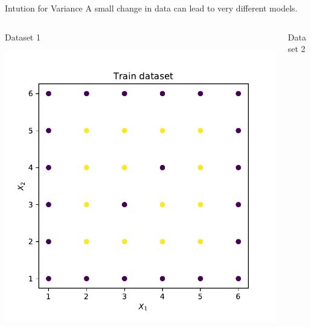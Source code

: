 \documentclass{beamer}
\begin{document}
\begin{frame}{Intution for Variance}
A small change in data can lead to very different models.\\
\vspace{1cm}
\begin{columns}
\begin{column}{0.5\textwidth}{\hspace{1.75cm} Dataset 1}
\begin{center}
\includegraphics[width = \textwidth]{bias-variance/imgs/dataset-2-train}
\end{center}
\end{column}
\begin{column}{0.5\textwidth}{\hspace{1.75cm} Dataset 2}
\begin{center}

\end{center}
\end{column}
\end{columns}
\end{frame}
\end{document}
